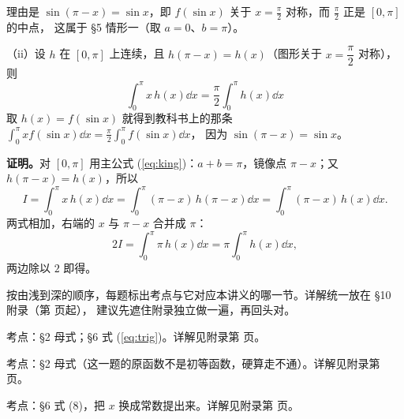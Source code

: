 \documentclass[11pt]{ctexart}
\begin{document}
理由是 $\sin(\pi-x)=\sin x$，即 $f(\sin x)$ 关于 $x=\frac{\pi}{2}$ 对称，而 $\frac{\pi}{2}$ 正是 $[0,\pi]$ 的中点，
这属于 §5 情形一（取 $a=0$、$b=\pi$）。

\noindent（ii）设 $h$ 在 $[0,\pi]$ 上连续，且 $h(\pi-x)=h(x)$（图形关于 $x=\dfrac{\pi}{2}$ 对称），则
\begin{equation}
\boxed{\;\int_0^{\pi} x\,h(x)\dd x=\frac{\pi}{2}\int_0^{\pi} h(x)\dd x\;}
\label{eq:xkill}
\end{equation}
取 $h(x)=f(\sin x)$ 就得到教科书上的那条 $\displaystyle\int_0^{\pi} x f(\sin x)\dd x=\frac{\pi}{2}\int_0^{\pi}f(\sin x)\dd x$，
因为 $\sin(\pi-x)=\sin x$。

\textbf{证明。}对 $[0,\pi]$ 用主公式 (\ref{eq:king})：$a+b=\pi$，镜像点 $\pi-x$；又 $h(\pi-x)=h(x)$，所以
\[
I=\int_0^{\pi} x\,h(x)\dd x=\int_0^{\pi}(\pi-x)\,h(\pi-x)\dd x=\int_0^{\pi}(\pi-x)\,h(x)\dd x .
\]
两式相加，右端的 $x$ 与 $\pi-x$ 合并成 $\pi$：
\[
2I=\int_0^{\pi}\pi\, h(x)\dd x=\pi\int_0^{\pi}h(x)\dd x ,
\]
两边除以 $2$ 即得。



按由浅到深的顺序，每题标出考点与它对应本讲义的哪一节。详解统一放在 §10 附录（第 \pageref{sol1} 页起），
建议先遮住附录独立做一遍，再回头对。



考点：§2 母式；§6 式 (\ref{eq:trig})。\quad 详解见附录第 \pageref{sol1} 页。



考点：§2 母式（这一题的原函数不是初等函数，硬算走不通）。\quad 详解见附录第 \pageref{sol2} 页。



考点：§6 式 (8)，把 $x$ 换成常数提出来。\quad 详解见附录第 \pageref{sol3} 页。

\end{document}
